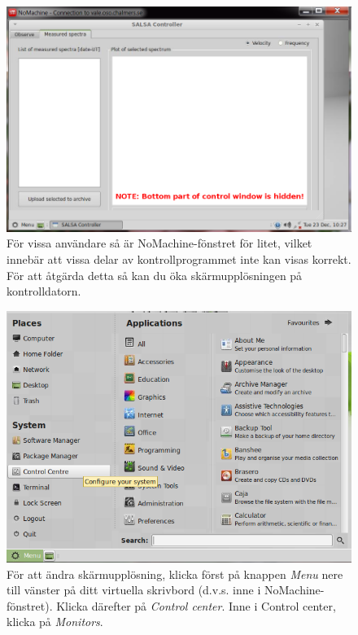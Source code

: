 \begin{figure}[H]
    \centering
    \includegraphics[height=0.3\paperheight]{../figures/nomachinefigs/fig9_toosmallwin.png}
    \caption{För vissa användare så är NoMachine-fönstret för litet, vilket innebär att vissa
		delar av kontrollprogrammet inte kan visas korrekt. För att åtgärda detta så kan du
		öka skärmupplösningen på kontrolldatorn.}
    \label{fig:toosmall}
\end{figure}

\begin{figure}[H]
    \centering
    \includegraphics[height=0.3\paperheight]{../figures/nomachinefigs/fig10_menu.png}
	\caption{För att ändra skärmupplösning, klicka först på knappen \emph{Menu} nere till
		vänster på ditt virtuella skrivbord (d.v.s. inne i NoMachine-fönstret). 
		Klicka därefter på \emph{Control center}. Inne i Control center, klicka på \emph{Monitors}.}
    \label{fig:controlcenter}
\end{figure}


